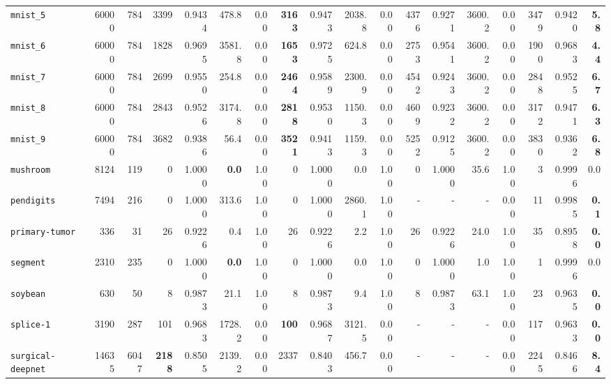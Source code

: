 \begin{tabular}{lccrrrrrrrrrrrrrrr}
\texttt{mnist\_5} & \multicolumn{1}{r}{60000} & \multicolumn{1}{r}{784}  & 3399 & 0.9434 & 478.8 & 0.00 & \textbf{3163} & 0.9473 & 2038.8 & 0.00 & 4376 & 0.9271 & 3600.2 & 0.00 & 3479 & 0.9420 & \textbf{5.8}\\
\texttt{mnist\_6} & \multicolumn{1}{r}{60000} & \multicolumn{1}{r}{784}  & 1828 & 0.9695 & 3581.8 & 0.00 & \textbf{1653} & 0.9725 & 624.8 & 0.00 & 2753 & 0.9541 & 3600.2 & 0.00 & 1900 & 0.9683 & \textbf{4.4}\\
\texttt{mnist\_7} & \multicolumn{1}{r}{60000} & \multicolumn{1}{r}{784}  & 2699 & 0.9550 & 254.8 & 0.00 & \textbf{2464} & 0.9589 & 2300.9 & 0.00 & 4542 & 0.9243 & 3600.2 & 0.00 & 2848 & 0.9525 & \textbf{6.7}\\
\texttt{mnist\_8} & \multicolumn{1}{r}{60000} & \multicolumn{1}{r}{784}  & 2843 & 0.9526 & 3174.8 & 0.00 & \textbf{2818} & 0.9530 & 1150.3 & 0.00 & 4609 & 0.9232 & 3600.2 & 0.00 & 3172 & 0.9471 & \textbf{6.3}\\
\texttt{mnist\_9} & \multicolumn{1}{r}{60000} & \multicolumn{1}{r}{784}  & 3682 & 0.9386 & 56.4 & 0.00 & \textbf{3521} & 0.9413 & 1159.3 & 0.00 & 5252 & 0.9125 & 3600.2 & 0.00 & 3830 & 0.9362 & \textbf{6.8}\\
\texttt{mushroom} & \multicolumn{1}{r}{8124} & \multicolumn{1}{r}{119}  & 0 & 1.0000 & \textbf{0.0} & 1.00 & 0 & 1.0000 & 0.0 & 1.00 & 0 & 1.0000 & 35.6 & 1.00 & 3 & 0.9996 & 0.0\\
\texttt{pendigits} & \multicolumn{1}{r}{7494} & \multicolumn{1}{r}{216}  & 0 & 1.0000 & 313.6 & 1.00 & 0 & 1.0000 & 2860.1 & 1.00 & - & - & - & 0.00 & 11 & 0.9985 & \textbf{0.1}\\
\texttt{primary-tumor} & \multicolumn{1}{r}{336} & \multicolumn{1}{r}{31}  & 26 & 0.9226 & 0.4 & 1.00 & 26 & 0.9226 & 2.2 & 1.00 & 26 & 0.9226 & 24.0 & 1.00 & 35 & 0.8958 & \textbf{0.0}\\
\texttt{segment} & \multicolumn{1}{r}{2310} & \multicolumn{1}{r}{235}  & 0 & 1.0000 & \textbf{0.0} & 1.00 & 0 & 1.0000 & 0.0 & 1.00 & 0 & 1.0000 & 1.0 & 1.00 & 1 & 0.9996 & 0.0\\
\texttt{soybean} & \multicolumn{1}{r}{630} & \multicolumn{1}{r}{50}  & 8 & 0.9873 & 21.1 & 1.00 & 8 & 0.9873 & 9.4 & 1.00 & 8 & 0.9873 & 63.1 & 1.00 & 23 & 0.9635 & \textbf{0.0}\\
\texttt{splice-1} & \multicolumn{1}{r}{3190} & \multicolumn{1}{r}{287}  & 101 & 0.9683 & 1728.2 & 0.00 & \textbf{100} & 0.9687 & 3121.5 & 0.00 & - & - & - & 0.00 & 117 & 0.9633 & \textbf{0.0}\\
\texttt{surgical-deepnet} & \multicolumn{1}{r}{14635} & \multicolumn{1}{r}{6047}  & \textbf{2188} & 0.8505 & 2139.2 & 0.00 & 2337 & 0.8403 & 456.7 & 0.00 & - & - & - & 0.00 & 2245 & 0.8466 & \textbf{8.4}\\

\end{tabular}
